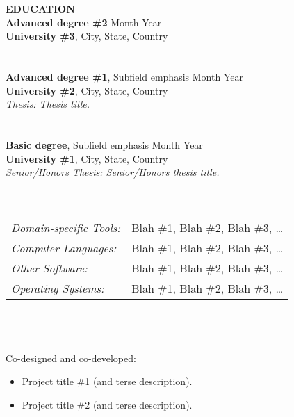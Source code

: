 \documentclass[letterpaper,10pt]{article}
\begin{document}
\hspace{-1.6cm}
{\bf EDUCATION}\\
{\bf Advanced degree \#2} \hfill Month Year\\
{\bf University \#3}, City, State, Country\\
\hspace{0cm}\\
\vspace{-0.7cm}\\
{\bf Advanced degree \#1}, Subfield emphasis \hfill Month Year\\
{\bf University \#2}, City, State, Country\\
{\it Thesis: Thesis title.} \\
\hspace{0cm}\\
\vspace{-0.7cm}\\
{\bf Basic degree}, Subfield emphasis \hfill Month Year\\
{\bf University \#1}, City, State, Country\\
{\it Senior/Honors Thesis: Senior/Honors thesis title.} \\
\vspace{-0.58cm}\hspace{0cm}\\


\hspace{-1.5cm}{\bf COMPUTER SKILLS}\\
\begin{tabular}{l p{4.95in}}
	\textit{Domain-specific Tools:} &		Blah \#1, Blah \#2, Blah \#3, \dots \\
	\textit{Computer Languages:} &		Blah \#1, Blah \#2, Blah \#3, \dots \\
	\textit{Other Software:} &			Blah \#1, Blah \#2, Blah \#3, \dots \\
	\textit{Operating Systems:} &		Blah \#1, Blah \#2, Blah \#3, \dots \\
\end{tabular}
\vspace{-0.75cm}\\
\hspace{0cm}\\


\hspace{-1.5cm}{\bf RELEVANT PROJECT EXPERIENCE}\\
Co-designed and co-developed: \vspace{-0.2cm}
\begin{itemize} \itemsep -4pt
\item Project title \#1 (and terse description).
\item Project title \#2 (and terse description).
\end{itemize} \vspace{-0.405cm}
\vspace{-0.35cm}
\hspace{0cm}\\
\end{document}
